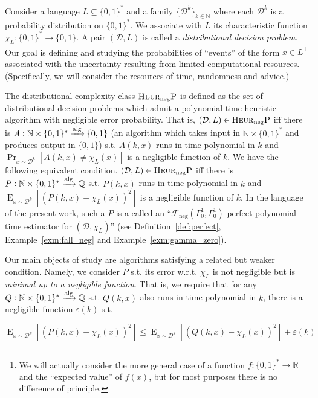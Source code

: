 \documentclass[11pt]{article}
\numberwithin{equation}{section}
\theoremstyle{definition}
\theoremstyle{plain}
\newcommand{\Bool}{\{0,1\}}
\newcommand{\Words}{{\Bool^*}}
\DeclareMathOperator{\Prb}{Pr}
\DeclareMathOperator{\E}{E}
\newcommand{\Nats}{\mathbb{N}}
\newcommand{\Rats}{\mathbb{Q}}
\newcommand{\Reals}{\mathbb{R}}
\newcommand{\Dist}{\mathcal{D}}
\newcommand{\Fall}{\mathcal{F}}
\newcommand{\Alg}{\xrightarrow{\textnormal{alg}}}
\begin{document}
Consider a language ${L \subseteq \Words}$ and a family ${\{\Dist^k\}}_{k \in \Nats}$ where each ${\Dist^k}$ is a probability distribution on ${\Words}$. We associate with $L$ its characteristic function $\chi_L: \Words \rightarrow \Bool$. A pair ${(\Dist,L)}$ is called a \emph{distributional decision problem}\cite{Bogdanov_2006}. Our goal is defining and studying the probabilities of \enquote{events} of the form ${x \in L}$\footnote{We will actually consider the more general case of a function ${f: \Words \rightarrow \Reals}$ and the \enquote{expected value} of ${f(x)}$, but for most purposes there is no difference of principle.}  associated with the uncertainty resulting from limited computational resources. (Specifically, we will consider the resources of time, randomness and advice.)

The distributional complexity class ${\textsc{Heur}_{\textnormal{neg}}\textsc{P}}$ is defined as the set of distributional decision problems which admit a polynomial-time heuristic algorithm with negligible error probability\cite{Bogdanov_2006}. That is, ${(\Dist, L) \in \textsc{Heur}_{\textnormal{neg}}\textsc{P}}$ iff there is ${A: \Nats \times \Words \Alg \Bool}$ (an algorithm which takes input in ${\Nats \times \Words}$ and produces output in ${\Bool}$) s.t. ${A(k,x)}$ runs in time polynomial in ${k}$ and ${\Prb_{x \sim \Dist^k}[A(k,x) \ne \chi_L(x)]}$ is a negligible function of ${k}$. We have the following equivalent condition. ${(\Dist, L) \in \textsc{Heur}_{\textnormal{neg}}\textsc{P}}$ iff there is ${P: \Nats \times \Words \Alg \Rats}$ s.t. ${P(k,x)}$ runs in time polynomial in ${k}$ and ${\E_{x \sim \Dist^k}[(P(k,x)-\chi_L(x))^2]}$ is a negligible function of ${k}$. In the language of the present work, such a ${P}$ is a called an \enquote{${\Fall_{\text{neg}}(\Gamma_0^1, \Gamma_0^1)}$-perfect polynomial-time estimator for ${(\Dist,\chi_L)}$} (see Definition~\ref{def:perfect}, Example~\ref{exm:fall_neg} and Example~\ref{exm:gamma_zero}).

Our main objects of study are algorithms satisfying a related but weaker condition. Namely, we consider ${P}$ s.t. its error w.r.t. ${\chi_L}$ is not negligible but is \emph{minimal up to a negligible function}. That is, we require that for any ${Q: \Nats \times \Words \Alg \Rats}$ s.t. ${Q(k,x)}$ also runs in time polynomial in ${k}$, there is a negligible function ${\varepsilon(k)}$ s.t. 

\[\E_{x \sim \Dist^k}[(P(k,x)-\chi_L(x))^2] \leq \E_{x \sim \Dist^k}[(Q(k,x)-\chi_L(x))^2] + \varepsilon(k)\]
\end{document}
